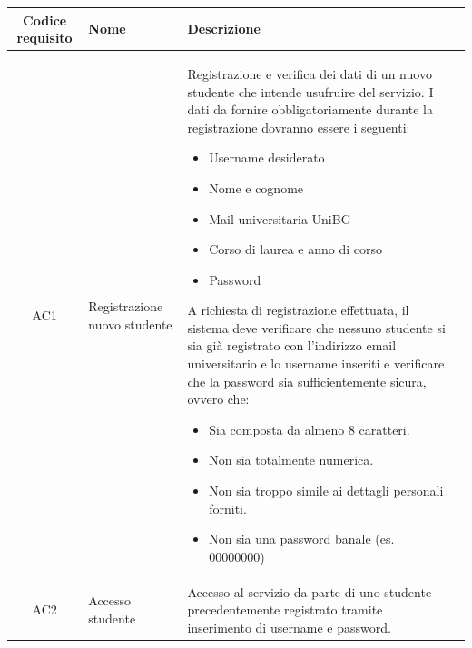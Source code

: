 \documentclass[10pt,a4paper]{report}
\begin{document}
	\begin{tabular}{cp{3cm}p{9cm}p{1cm}}
		Codice requisito&Nome&Descrizione\\ \hline
		AC1&Registrazione nuovo studente&Registrazione e verifica dei dati di un nuovo studente che intende usufruire del servizio. I dati da fornire obbligatoriamente durante la registrazione dovranno essere i seguenti:
		\begin{itemize}
			\item Username desiderato
			\item Nome e cognome
			\item Mail universitaria UniBG
			\item Corso di laurea e anno di corso
			\item Password
		\end{itemize}
		A richiesta di registrazione effettuata, il sistema deve verificare che nessuno studente si sia già registrato con l'indirizzo email universitario e lo username inseriti e verificare che la password sia sufficientemente sicura, ovvero che:
		\begin{itemize}
			\item Sia composta da almeno 8 caratteri.
			\item Non sia totalmente numerica.
			\item Non sia troppo simile ai dettagli personali forniti.
			\item Non sia una password banale (es. 00000000)
		\end{itemize}\\ \hline
		AC2&Accesso studente&Accesso al servizio da parte di uno studente precedentemente registrato tramite inserimento di username e password.\\ \hline
	\end{tabular}
\end{document}
